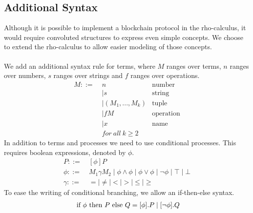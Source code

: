 \subsection{Additional Syntax} \label{sec:addsyntax}
Although it is possible to implement a blockchain protocol in the rho-calculus, it would require convoluted structures to express even simple concepts.
We choose to extend the rho-calculus to allow easier modeling of those concepts.\\
\\
We add an additional syntax rule for terms, where $M$ ranges over terms, $n$ ranges over numbers, $s$ ranges over strings and $f$ ranges over operations.
\begin{align*}
M::=\; & n &\text{number}\\
 &\mid s &\text{string}\\
 &\mid (M_1,...,M_k)&\text{tuple}\\
 &\mid fM &\text{operation}\\
 &\mid x&\text{name}\\
 &for\ all\ k \geq 2
\end{align*}
In addition to terms and processes we need to use conditional processes. This requires boolean expressions, denoted by \ensuremath{\phi}.
\begin{align*}
P::=& \ [\phi] P\\
\phi ::=& \ M_1\gamma M_2 \mid \phi\land\phi \mid \phi\lor\phi \mid \neg\phi \mid \top \mid \bot\\
\gamma ::=& \ = \mid \neq \mid < \mid > \mid \leq \mid \geq
\end{align*}
To ease the writing of conditional branching, we allow an if-then-else syntax.
\begin{align*}
	\text{ if }\phi\text{ then }P\text{ else }Q = [\phi].P \mid [\neg \phi].Q
\end{align*}

